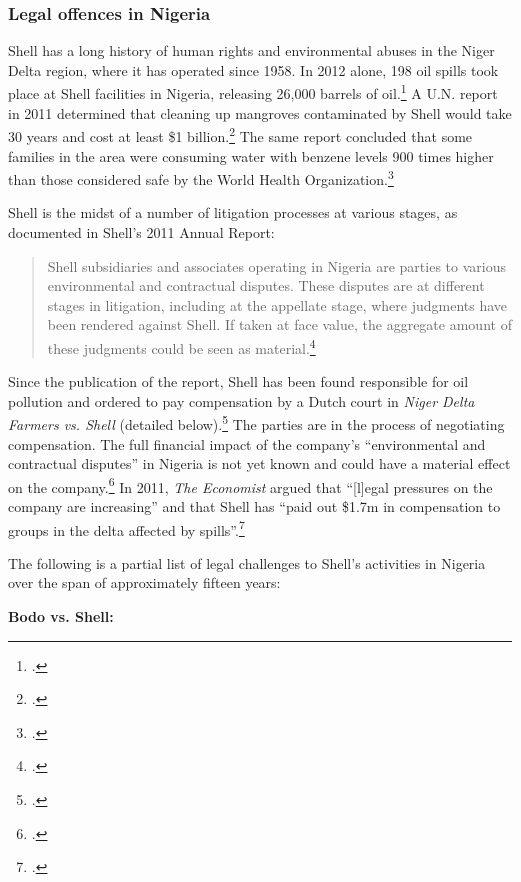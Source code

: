 \documentclass[10pt]{article}
\begin{document}
	\subsubsection{Legal offences in Nigeria}



Shell has a long history of human rights and environmental abuses in the Niger Delta region, where it has operated since 1958.
In 2012 alone, 198 oil spills took place at Shell facilities in Nigeria, releasing 26,000 barrels of oil.\footcite{DutchResponsible}
A U.N. report in 2011 determined that cleaning up mangroves contaminated by Shell would take 30 years and cost at least \$1 billion.\footcite{Ogoniland}
The same report concluded that some families in the area were consuming water with benzene levels 900 times higher than those considered safe by the World Health Organization.\footcite{OilSpoils}



Shell is the midst of a number of litigation processes at various stages, as documented in Shell's 2011 Annual Report:
\begin{quote}
Shell subsidiaries and associates operating in Nigeria are parties to various environmental and contractual disputes.
These disputes are at different stages in litigation, including at the appellate stage, where judgments have been rendered against Shell. 
If taken at face value, the aggregate amount of these judgments could be seen as material.\footcite[][P.138]{Shell_2011}
\end{quote}
Since the publication of the report, Shell has been found responsible for oil pollution and ordered to pay compensation by a Dutch court in \emph{Niger Delta Farmers vs. Shell} (detailed below).\footcite[See also:][]{DutchResponsible}
The parties are in the process of negotiating compensation.
The full financial impact of the company's ``environmental and contractual disputes'' in Nigeria is not yet known and could have a material effect on the company.\footcite[][p. 139]{Shell_2011}
In 2011, \emph{The Economist} argued that ``[l]egal pressures on the company are increasing'' and that Shell has ``paid out \$1.7m in compensation to groups in the delta affected by spills''.\footcite{OilSpoils}


The following is a partial list of legal challenges to Shell's activities in Nigeria over the span of approximately fifteen years:



\textbf{Bodo vs. Shell:}
\end{document}
